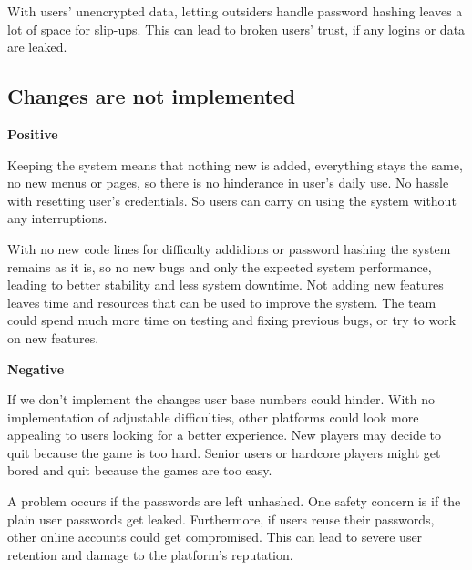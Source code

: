 \documentclass[11pt,a4paper]{article}
\newcommand{\heading}[1]{\vspace{1em}\noindent\textbf{#1}\par\vspace{0.5em}}
\begin{document}
With users' unencrypted data, letting outsiders handle password hashing leaves a lot of space for slip-ups. This can lead to broken users’ trust, if any logins or data are leaked.

\newpage
\subsection{Changes are not implemented}
\heading{Positive}
Keeping the system means that nothing new is added, everything stays the same, no new menus or pages, so there is no hinderance in user's daily use. No hassle with resetting user's credentials. So users can carry on using the system without any interruptions.

With no new code lines for difficulty addidions or password hashing the system remains as it is, so no new bugs and only the expected system performance, leading to better stability and less system downtime. Not adding new features leaves time and resources that can be used to improve the system. The team could spend much more time on testing and fixing previous bugs, or try to work on new features.

\heading{Negative}
If we don't implement the changes user base numbers could hinder. With no implementation of adjustable difficulties, other platforms could look more appealing to users looking for a better experience. New players may decide to quit because the game is too hard. Senior users or hardcore players might get bored and quit because the games are too easy.

A problem occurs if the passwords are left unhashed. One safety concern is if the plain user passwords get leaked. Furthermore, if users reuse their passwords, other online accounts could get compromised. This can lead to severe user retention and damage to the platform's reputation.


\end{document}
